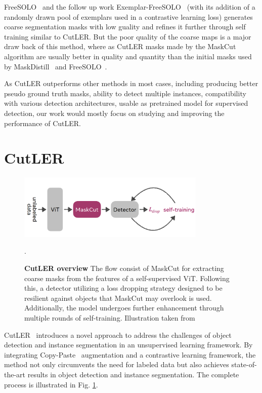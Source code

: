 FreeSOLO~\cite{wang2022freesolo} and the follow up work Exemplar-FreeSOLO~\cite{Ishtiak_2023_CVPR} (with its addition of a randomly drawn pool of exemplars used in a contrastive learning loss) generates coarse segmentation masks with low guality and refines it further through self training similar to CutLER. But the poor quality of the coarse maps is a major draw back of this method, where as CutLER masks made by the MaskCut~\cite{wang2023cut, wang2022tokencut} algorithm are usually better in quality and quantity than the initial masks used by MaskDistill~\cite{vangansbeke2022discovering} and FreeSOLO~\cite{wang2022freesolo}. 

As CutLER outperforms other methods in most cases, including producing better pseudo ground truth masks, ability to detect multiple instances, compatibility with various detection architectures, usable as pretrained model for supervised detection, our work would mostly focus on studying and improving the performance of CutLER.

\section{CutLER}
\begin{figure}
	\centering
	\includegraphics[width=0.8\textwidth]{Images/main/cutler_flow.png}
	\caption[\textbf{CutLER Overview}]{\textbf{CutLER overview} The flow consist of MaskCut for extracting coarse masks from the features of a self-supervised ViT. Following this, a detector utilizing a loss dropping strategy designed to be resilient against objects that MaskCut may overlook is used. Additionally, the model undergoes further enhancement through multiple rounds of self-training. Illustration taken from~\cite{wang2023cut}}.
	\label{fig:cutler_flow}
\end{figure} 

CutLER~\cite{wang2023cut} introduces a novel approach to address the challenges of object detection and instance segmentation in an unsupervised learning framework. By integrating Copy-Paste~\cite{ghiasi2021simplecopypastestrongdata} augmentation and a contrastive learning framework, the method not only circumvents the need for labeled data but also achieves state-of-the-art results in object detection and instance segmentation. The complete process is illustrated in Fig. \ref{fig:cutler_flow}.
 
